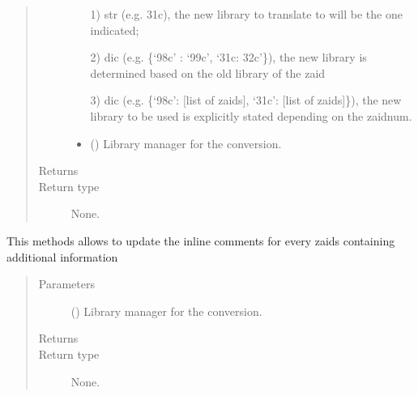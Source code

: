 \documentclass[letterpaper,10pt,english]{sphinxmanual}
\begin{document}
\begin{fulllineitems}
\begin{fulllineitems}
\begin{quote}
\begin{description}
\begin{itemize}
1) str (e.g. 31c), the new library to translate to will be the
one indicated;

2) dic (e.g. \{‘98c’ : ‘99c’, ‘31c: 32c’\}), the new library is
determined based on the old library of the zaid

3) dic (e.g. \{‘98c’: {[}list of zaids{]}, ‘31c’: {[}list of zaids{]}\}),
the new library to be used is explicitly stated depending
on the zaidnum.


\item {} 
 ({\hyperref[\detokenize{api/initobjects:libmanager.LibManager}]{}}) \textendash{} Library manager for the conversion.

\end{itemize}

\item[{Returns}] \leavevmode


\item[{Return type}] \leavevmode
None.

\end{description}\end{quote}

\end{fulllineitems}


\begin{fulllineitems}
\label{\detokenize{api/inputgeneration:matreader.MatCardsList.update_info}}
This methods allows to update the in\sphinxhyphen{}line comments for every zaids
containing additional information
\begin{quote}\begin{description}
\item[{Parameters}] \leavevmode
{} () \textendash{} Library manager for the conversion.

\item[{Returns}] \leavevmode


\item[{Return type}] \leavevmode
None.

\end{description}\end{quote}

\end{fulllineitems}


\end{fulllineitems}
\end{document}
